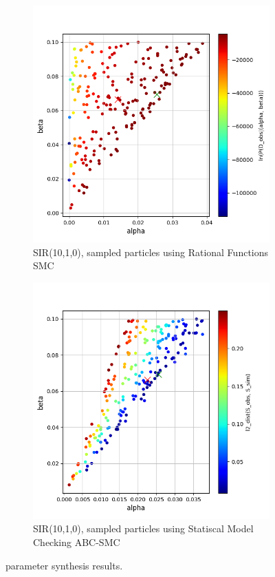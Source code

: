 \begin{figure}[H]
    \centering
    \begin{subfigure}{0.48\textwidth}
        \centering
        \includegraphics[width=\linewidth]{figures/sir1010_rfsmc.png}
        \caption{SIR(10,1,0), sampled particles using Rational Functions SMC}
    \end{subfigure}
    \hfill
    \begin{subfigure}{0.48\textwidth}
        \centering
        \includegraphics[width=\linewidth]{figures/sir1010_abcsmc.png}
        \caption{SIR(10,1,0), sampled particles using Statiscal Model Checking ABC-SMC}
    \end{subfigure}
    \caption{ parameter synthesis results.}
\end{figure}

